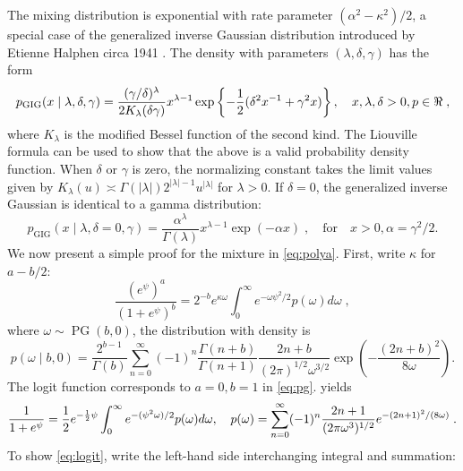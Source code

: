 \documentclass[lineno]{biometrika}
\begin{document}
The mixing distribution is exponential with rate parameter $(\alpha^2-\kappa^2)/2$, a special case of the generalized inverse Gaussian distribution introduced by Etienne Halphen circa 1941
\citep{seshadri1997halphen}.  The density with parameters $(\lambda, \delta, \gamma)$ 
has the form 
\begin{equation*}
  p_{\mathrm{GIG}}(x \mid \lambda, \delta, \gamma) = \frac{(\gamma/\delta)^{\lambda}}{2 K_{\lambda}(\delta \gamma)} x^{\lambda-1} 
  \exp\left\{ -\frac{1}{2} (\delta^2 x^{-1} + \gamma^2 x )\right\}, \quad x, \lambda, \delta > 0,  p \in \Re
  \;,
\end{equation*}
where $K_{\lambda}$ is the modified Bessel function of the second kind.  The Liouville formula can be used to show that the above is a valid probability density
function.  When $\delta$ or $\gamma$ is zero, the normalizing constant takes the limit values given by $K_{\lambda}(u) \asymp \Gamma(|\lambda|) 2^{|\lambda|-1} u^{|\lambda|}$ 
for $\lambda > 0$.  If $\delta=0$, the generalized inverse Gaussian is identical to a gamma distribution:
\[
p_{\mathrm{GIG}}(x \mid \lambda, \delta = 0 , \gamma) 
= \frac{\alpha^{\lambda}}{\Gamma(\lambda)} x^{\lambda-1} \exp(-\alpha x) 
\;, \quad\text{for}\quad x > 0, \alpha = \gamma^2 / 2.
\]
%
We now present a simple proof for the \PG{} mixture in \eqref{eq:polya}. 
First, write $\kappa$ for $a-b/2$: 
\begin{equation}
  \frac{(e^{\psi})^a}{(1+e^{\psi})^b} = 2^{-b} e^{\kappa \omega} 
  \int_0^{\infty} e^{-\omega \psi^2/2} p(\omega) d\omega
  \;, 
  \label{eq:pg}
\end{equation}
where $\omega \sim \operatorname{PG}(b,0)$, the \PG{} distribution with density is
$$
p(\omega \mid b, 0) = \frac{2^{b-1}}{\Gamma(b)} 
\sum_{n=0}^{\infty} (-1)^n \frac{\Gamma(n+b)}{\Gamma(n+1)} 
\frac{2n + b}{(2 \pi)^{1/2} \omega^{3/2}} 
\exp\left(-\frac{(2 n + b)^2}{8 \omega} \right).
$$
The logit function corresponds to $a=0,b=1$ in \eqref{eq:pg}. \CS{} yields
\begin{equation}
  \frac{1}{1+e^{\psi}} = \half e^{-\half \psi} \int_0^{\infty} e^{-(\psi^2\omega)/2} p(\omega) d\omega,
  \quad p(\omega) = \sum_{n=0}^{\infty} (-1)^n \frac{2n+1}{ (2 \pi \omega^3)^{1/2}} 
  e^{-(2n+1)^2/(8 \omega)}
  \label{eq:logit}
  \;.
\end{equation}
To show \eqref{eq:logit}, write the left-hand side interchanging integral and summation:
\end{document}

